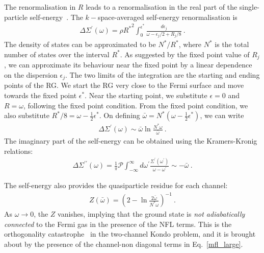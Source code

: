 \documentclass[reprint,hidelinks,onecolumn]{revtex4-2}
\begin{document}
The renormalisation in \(R\) leads to a renormalisation in the real part of the single-particle self-energy~\cite{anirbanmott1}. The \(k-\)space-averaged self-energy renormalisation is
\begin{eqnarray}
	\Delta \Sigma^\prime(\omega) = \rho {R^*}^2\int_0^{\epsilon^*} \frac{d\epsilon_j}{\omega - \epsilon_j/2 + R_j/8}~.
\end{eqnarray}
The density of states can be approximated to be \(N^*/R^*\), where \(N^*\) is the total number of states over the interval \(R^*\). As suggested by the fixed point value of \(R_j\), we can approximate its behaviour near the fixed point by a linear dependence on the dispersion \(\epsilon_j\). The two limits of the integration are the starting and ending points of the RG. We start the RG very close to the Fermi surface and move towards the fixed point \(\epsilon^*\). Near the starting point, we substitute \(\epsilon = 0\) and \(R = \omega\), following the fixed point condition. From the fixed point condition, we also substitute \(R^*/8 = \omega - \frac{1}{2}\epsilon^*\). On defining \(\bar \omega = N^* \left(\omega - \frac{1}{2}\epsilon^*\right)\), we can write
\begin{eqnarray}
	\label{self_energy}
	\Delta \Sigma^\prime(\omega) \sim  \bar \omega \ln \frac{N^* \omega}{\bar \omega}~.
\end{eqnarray}
The imaginary part of the self-energy can be obtained using the Kramers-Kronig relations:
\begin{equation}\begin{aligned}
\Delta \Sigma^{\prime\prime}(\omega) = \frac{1}{\pi}\mathcal{P} \int_{-\infty}^\infty d\omega^\prime \frac{\Sigma^\prime(\omega^\prime)}{\omega - \omega^\prime} \sim -\bar\omega~.
\end{aligned}\end{equation}

The self-energy also provides the quasiparticle residue for each channel\cite{anirbanmott1}:
\begin{eqnarray}
	Z(\bar\omega) = \left(2 - \ln \frac{2\bar\omega}{N^* \omega}\right) ^{-1}~.
\end{eqnarray}
As \(\omega \to 0\), the \(Z\) vanishes, implying that the ground state is {\it not adiabatically connected} to the Fermi gas in the presence of the NFL terms.
This is the orthogonality catastrophe~\cite{varma2002singular,anderson_infraredcat,yamada_catastrophe,yamada1979orthogonality} in the two-channel Kondo problem, and it is brought about by the presence of the channel-non diagonal terms in Eq.~\ref{mfl_large}.
\end{document}

